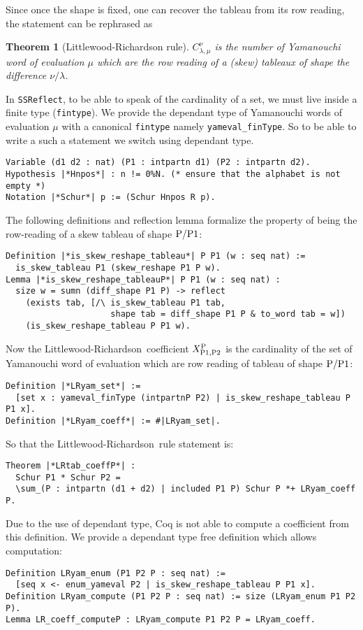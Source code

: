 \documentclass[12pt,a4paper]{article}
\let\verb=\lstinline
\newcommand{\SSR}{\texttt{SSReflect}\xspace}
\newcommand{\LR}{Littlewood-Richardson\ }
\newcommand{\var}[1]{\text{\verb{#1}}}
\newtheorem{THEO}{Theorem}
\begin{document}
Since once the shape is fixed, one can recover the tableau from its row
reading, the statement can be rephrased as
\begin{THEO}[Littlewood-Richardson rule]
  $C_{\lambda, \mu}^{\nu}$ is the number of Yamanouchi word of evaluation
  $\mu$ which are the row reading of a (skew) tableaux of shape the difference
  $\nu/\lambda$.
\end{THEO}

In \SSR, to be able to speak of the cardinality of a set, we must live inside
a finite type (\verb{fintype}). We provide the dependant type of Yamanouchi
words of evaluation $\mu$ with a canonical \verb{fintype} namely
\verb{yameval_finType}. So to be able to write a such a statement we switch
using dependant type.
\begin{lstlisting}
Variable (d1 d2 : nat) (P1 : intpartn d1) (P2 : intpartn d2).
Hypothesis |*Hnpos*| : n != 0%
Notation |*Schur*| p := (Schur Hnpos R p).
\end{lstlisting}
The following definitions and reflection lemma formalize the property of being
the row-reading of a skew tableau of shape $\var{P}/\var{P1}$:
\begin{lstlisting}
Definition |*is_skew_reshape_tableau*| P P1 (w : seq nat) :=
  is_skew_tableau P1 (skew_reshape P1 P w).
Lemma |*is_skew_reshape_tableauP*| P P1 (w : seq nat) :
  size w = sumn (diff_shape P1 P) -> reflect
    (exists tab, [/\ is_skew_tableau P1 tab,
                     shape tab = diff_shape P1 P & to_word tab = w])
    (is_skew_reshape_tableau P P1 w).
\end{lstlisting}
Now the \LR coefficient $X_{\var{P1},\var{P2}}^{\var{P}}$ is the cardinality of
the set of Yamanouchi word of evaluation which are row reading of tableau of
shape $\var{P}/\var{P1}$:
\begin{lstlisting}
Definition |*LRyam_set*| :=
  [set x : yameval_finType (intpartnP P2) | is_skew_reshape_tableau P P1 x].
Definition |*LRyam_coeff*| := #|LRyam_set|.
\end{lstlisting}
So that the \LR rule statement is:
\begin{lstlisting}
Theorem |*LRtab_coeffP*| :
  Schur P1 * Schur P2 =
  \sum_(P : intpartn (d1 + d2) | included P1 P) Schur P *+ LRyam_coeff P.
\end{lstlisting}
Due to the use of dependant type, Coq is not able to compute a coefficient
from this definition. We provide a dependant type free definition which allows
computation:
\begin{lstlisting}
Definition LRyam_enum (P1 P2 P : seq nat) :=
  [seq x <- enum_yameval P2 | is_skew_reshape_tableau P P1 x].
Definition LRyam_compute (P1 P2 P : seq nat) := size (LRyam_enum P1 P2 P).
Lemma LR_coeff_computeP : LRyam_compute P1 P2 P = LRyam_coeff.
\end{lstlisting}
\end{document}
